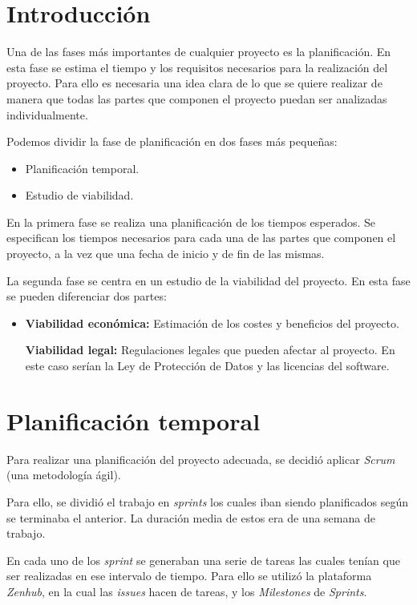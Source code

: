 
\section{Introducción}

Una de las fases más importantes de cualquier proyecto es la planificación. En esta fase se estima el tiempo y los requisitos necesarios para la realización del proyecto. Para ello es necesaria una idea clara de lo que se quiere realizar de manera que todas las partes que componen el proyecto puedan ser analizadas individualmente.

Podemos dividir la fase de planificación en dos fases más pequeñas:

\begin{itemize}
\item
  Planificación temporal.
\item
  Estudio de viabilidad.
\end{itemize}

En la primera fase se realiza una planificación de los tiempos esperados. Se especifican los tiempos necesarios para cada una de las partes que componen el proyecto, a la vez que una fecha de inicio y de fin de las mismas.

La segunda fase se centra en un estudio de la viabilidad del proyecto. En esta fase se pueden diferenciar dos partes:

\begin{itemize}
\item
\textbf{Viabilidad económica:} Estimación de los costes y beneficios del proyecto.

\textbf{Viabilidad legal:} Regulaciones legales que pueden afectar al proyecto. En este caso serían la Ley de Protección de Datos y las licencias del software.
\end{itemize}

\section{Planificación temporal}

Para realizar una planificación del proyecto adecuada, se decidió aplicar \emph{Scrum} (una metodología ágil).

Para ello, se dividió el trabajo en \emph{sprints} los cuales iban siendo planificados según se terminaba el anterior. La duración media de estos era de una semana de trabajo.

En cada uno de los \emph{sprint} se generaban una serie de tareas las cuales tenían que ser realizadas en ese intervalo de tiempo. Para ello se utilizó la plataforma \emph{Zenhub}, en la cual las \emph{issues} hacen de tareas, y los \emph{Milestones} de \emph{Sprints}.

